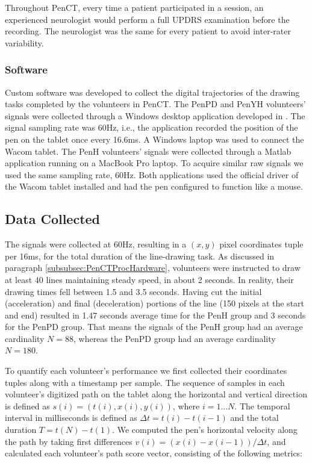 Throughout \gls{PenCT}, every time a patient participated in a session, an experienced neurologist would perform a full \gls{UPDRS} examination before the recording. The neurologist was the same for every patient to avoid inter-rater variability. 
 
\subsubsection{Software}
\label{subsubsec:PenCTSoftware}
Custom software was developed to collect the digital trajectories of the drawing tasks completed by the volunteers in \gls{PenCT}. The \gls{PenPD} and \gls{PenYH} volunteers' signals were collected through a Windows desktop application developed in . The signal sampling rate was 60Hz, i.e., the application recorded the position of the pen on the tablet once every 16.6ms. A Windows laptop was used to connect the Wacom tablet. The \gls{PenH} volunteers' signals were collected through a Matlab application running on a MacBook Pro laptop. To acquire similar raw signals we used the same sampling rate, 60Hz. Both applications used the official driver of the Wacom tablet installed and had the pen configured to function like a mouse.  

\subsection{Data Collected}
\label{subsec:PenCTData}
The signals were collected at 60Hz, resulting in a $(x,y)$ pixel coordinates tuple per 16ms, for the total duration of the line-drawing task. As discussed in paragraph \ref{subsubsec:PenCTProcHardware}, volunteers were instructed to draw at least 40 lines maintaining steady speed, in about 2 seconds. In reality, their drawing times fell between 1.5 and 3.5 seconds. Having cut the initial (acceleration) and final (deceleration) portions of the line (150 pixels at the start and end) resulted in 1.47 seconds average time for the \gls{PenH} group and 3 seconds for the \gls{PenPD} group. That means the signals of the \gls{PenH} group had an average cardinality $N=88$, whereas the \gls{PenPD} group had an average cardinality $N=180$. 

To quantify each volunteer's performance we first collected their coordinates tuples along with a timestamp per sample. The sequence of samples in each volunteer's digitized path on the tablet along the horizontal and vertical direction is defined as $s(i) = (t(i),x(i),y(i))$, where $i = 1...N$. The temporal interval in milliseconds is defined as $\Delta t = t(i)-t(i-1)$ and the total duration $T = t(N)-t(1)$. We computed the pen's horizontal velocity along the path by taking first differences $v(i)=(x(i)-x(i-1))/\Delta t$, and calculated each volunteer's path score vector, consisting of the following metrics:

